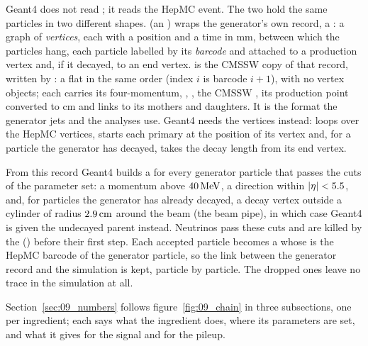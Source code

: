 \begin{plainwords}
Geant4 does not read ; it reads the HepMC event. The two hold the same particles in two
different shapes.  (an ) wraps the generator's own record, a
: a graph of \emph{vertices}, each with a position and a time in mm, between which the
particles hang, each particle labelled by its \emph{barcode} and attached to a production vertex and, if it
decayed, to an end vertex.  is the CMSSW copy of that record, written by
: a flat  in the same order (index $i$ is barcode
$i+1$), with no vertex objects; each  carries its four-momentum, ,
, the CMSSW , its production point  converted to cm and
 links to its mothers and daughters. It is the format the generator jets and the analyses use.
Geant4 needs the vertices instead:  loops over the HepMC vertices, starts each primary at the
position of its vertex and, for a particle the generator has decayed, takes the decay length from its end vertex.
\par\smallskip
From this record Geant4 builds a  for every generator particle that passes the cuts of the  parameter set: a momentum above
$40\,\mathrm{MeV}$, a direction within $|\eta|<5.5$, and, for particles the generator has already decayed, a decay vertex
outside a cylinder of radius $2.9\,\mathrm{cm}$ around the beam (the beam pipe), in which case Geant4 is given the
undecayed parent instead. Neutrinos pass these cuts and are killed by the 
() before their first step. Each accepted particle becomes a  whose
 is the HepMC barcode of the generator particle, so the link between the generator record
and the simulation is kept, particle by particle. The dropped ones leave no trace in the simulation at all.
\end{plainwords}

Section~\ref{sec:09_numbers} follows figure~\ref{fig:09_chain} in three subsections, one per ingredient; each
says what the ingredient does, where its parameters are set, and what it gives for the signal and for the pileup.

